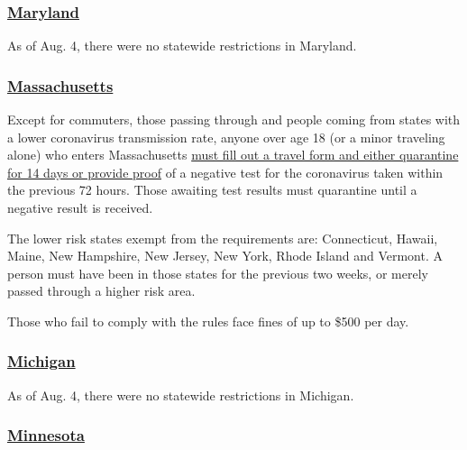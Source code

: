\hypertarget{maryland}{%
\subsubsection{\texorpdfstring{\href{https://www.visitmaryland.org/article/travel-alerts}{Maryland}}{Maryland}}\label{maryland}}

As of Aug. 4, there were no statewide restrictions in Maryland.

\hypertarget{massachusetts}{%
\subsubsection{\texorpdfstring{\href{https://www.mass.gov/info-details/covid-19-updates-and-information}{Massachusetts}}{Massachusetts}}\label{massachusetts}}

Except for commuters, those passing through and people coming from
states with a lower coronavirus transmission rate, anyone over age 18
(or a minor traveling alone) who enters Massachusetts
\href{https://www.mass.gov/info-details/covid-19-travel-order}{must fill
out a travel form and either quarantine for 14 days or provide proof} of
a negative test for the coronavirus taken within the previous 72 hours.
Those awaiting test results must quarantine until a negative result is
received.

The lower risk states exempt from the requirements are: Connecticut,
Hawaii, Maine, New Hampshire, New Jersey, New York, Rhode Island and
Vermont. A person must have been in those states for the previous two
weeks, or merely passed through a higher risk area.

Those who fail to comply with the rules face fines of up to \$500 per
day.

\hypertarget{michigan}{%
\subsubsection{\texorpdfstring{\href{https://www.michigan.gov/coronavirus/}{Michigan}}{Michigan}}\label{michigan}}

As of Aug. 4, there were no statewide restrictions in Michigan.

\hypertarget{minnesota}{%
\subsubsection{\texorpdfstring{\href{https://www.exploreminnesota.com/info/coronavirus-covid-19-information}{Minnesota}}{Minnesota}}\label{minnesota}}

